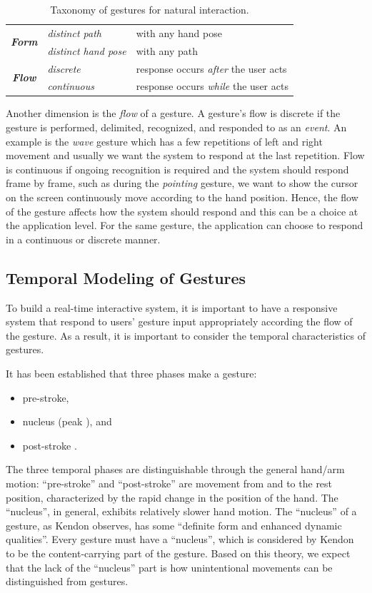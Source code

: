 \documentclass[conference]{IEEEtran}
\begin{document}
\begin{table}[t]
\caption{Taxonomy of gestures for natural interaction.}
\label{tab:taxonomy}
\centering
\begin{tabular}{|c|l|l|}
\hline
\multirow{2}{*}{\textbf{\textit{Form}}} & \textit{distinct path} & with any hand
pose
\\
\cline{2-3} 
                               & \textit{distinct hand pose} & with any path \\
\hline
\multirow{2}{*}{\textbf{\textit{Flow}}} & \textit{discrete} & response occurs
\textit{after} the user acts \\
\cline{2-3}
              & \textit{continuous} & response occurs \textit{while} the user
              acts \\
\hline
\end{tabular}
\end{table}

Another dimension is the \textit{flow} of a gesture. A gesture's flow is
discrete if the gesture is performed, delimited, recognized, and responded to
as an \textit{event}. An example is the \textit{wave} gesture which has a few
repetitions of left and right movement and usually we want the system to respond
at the last repetition. Flow is continuous if ongoing recognition is required
and the system should respond frame by frame, such as during the
\textit{pointing} gesture, we want to show the cursor on the screen continuously
move according to the hand position. Hence, the flow of the gesture affects how
the system should respond and this can be a choice at the application level. For
the same gesture, the application can choose to respond in a continuous or
discrete manner. 

\subsection{Temporal Modeling of Gestures}
To build a real-time interactive system, it is important to have a responsive
system that respond to users' gesture input appropriately according the flow of
the gesture. As a result, it is important to consider the temporal
characteristics of gestures.

It has been established that three phases make a gesture:
\begin{itemize}
  \item pre-stroke,
  \item nucleus (peak \cite{mcneill82}), and
  \item post-stroke \cite{Pavlovic97}.
\end{itemize}
The three temporal phases are distinguishable through the general hand/arm
motion: ``pre-stroke'' and ``post-stroke'' are movement from and to the
rest position, characterized by the rapid change in the position of the hand.
The ``nucleus'', in general, exhibits relatively slower hand motion. The ``nucleus'' of a gesture,
as Kendon \cite{kendon86} observes, has some ``definite form and enhanced dynamic
qualities''. Every gesture must have a ``nucleus'', which is considered by
Kendon to be the content-carrying part of the gesture. Based on this theory, we
expect that the lack of the ``nucleus'' part is how unintentional movements can
be distinguished from gestures. 
\end{document}
